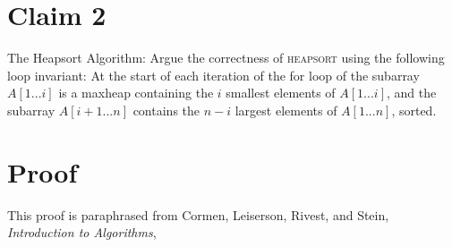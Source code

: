 \documentclass[12pt]{article}
\begin{document}
\newpage
\section*{Claim 2}
The Heapsort Algorithm: Argue the correctness of \textsc{heapsort} using the following loop invariant: At the start of each iteration of the for loop of the subarray $A[ 1...i ]$ is a maxheap containing the $i$ smallest elements of $A[1...i]$, and the subarray $A[i+1...n]$ contains the $n-i$ largest elements of $A[1...n]$, sorted. 


\section*{Proof}
This proof is paraphrased from Cormen, Leiserson, Rivest, and Stein, \textit{Introduction to Algorithms}, \cite{cormen2009introduction}
\end{document}
